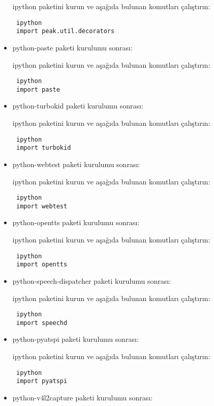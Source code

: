 \documentclass[a4paper,10pt]{article}
\begin{document}
\begin{itemize}
ipython paketini kurun ve aşağıda bulunan komutları çalıştırın:
\begin{verbatim}
 ipython
 import peak.util.decorators
\end{verbatim}

\item python-paste paketi kurulumu sonrası:

ipython paketini kurun ve aşağıda bulunan komutları çalıştırın:
\begin{verbatim}
 ipython
 import paste
\end{verbatim}

\item python-turbokid paketi kurulumu sonrası:

ipython paketini kurun ve aşağıda bulunan komutları çalıştırın:
\begin{verbatim}
 ipython
 import turbokid
\end{verbatim}

\item python-webtest paketi kurulumu sonrası:

ipython paketini kurun ve aşağıda bulunan komutları çalıştırın:
\begin{verbatim}
 ipython
 import webtest
\end{verbatim}


\item python-opentts paketi kurulumu sonrası:

ipython paketini kurun ve aşağıda bulunan komutları çalıştırın:
\begin{verbatim}
 ipython
 import opentts
\end{verbatim}

\item python-speech-dispatcher paketi kurulumu sonrası:

ipython paketini kurun ve aşağıda bulunan komutları çalıştırın:
\begin{verbatim}
 ipython
 import speechd
\end{verbatim}

\item python-pyatspi paketi kurulumu sonrası:

ipython paketini kurun ve aşağıda bulunan komutları çalıştırın:
\begin{verbatim}
 ipython
 import pyatspi
\end{verbatim}

\item python-v4l2capture paketi kurulumu sonrası:


\end{itemize}
\end{document}
